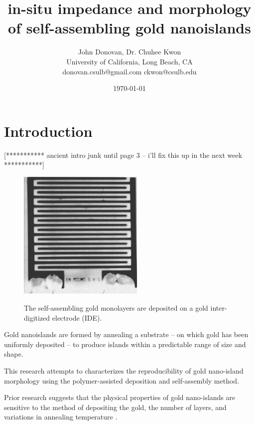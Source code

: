 \documentclass[12pt,oneside,english]{article}
\begin{document}

        \title{in-situ impedance and morphology of self-assembling gold nanoislands}

	\author{John Donovan, Dr. Chuhee Kwon\\
	University of California, Long Beach, CA\\
	{\small donovan.csulb@gmail.com ckwon@csulb.edu}}
	
        \date{\today}

	\maketitle

	\tableofcontents
	\clearpage

        \section{Introduction}

[*********** ancient intro junk until page 3 -- i'll fix this up in the next week ***********]

	\begin{figure}
	\includegraphics[width=60mm]{images/IDE.eps} \label{f:IDE}
	\caption{The self-assembling gold monolayers are deposited on a gold inter-digitized electrode (IDE).}
	\end{figure}
	
	Gold nanoislands are formed by annealing a substrate -- on which gold has been uniformly deposited -- to produce islands within a predictable range of size and shape.
	
	This research attempts to characterizes the reproducibility of gold nano-island morphology using the polymer-assisted deposition and self-assembly method.
	
	Prior research suggests that the physical properties of gold nano-islands are sensitive to the method of depositing the gold, the number of layers, and variations in annealing temperature \cite{shon11}.
\end{document}
